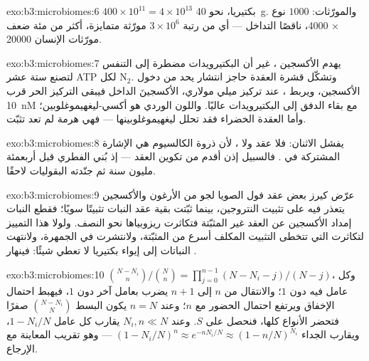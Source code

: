 \begin{solution}{exo:b3:microbiomes:6}
$400\times 10^{11} = 4\times 10^{13}$ بكتيريا، نحو \qty{40}{g}.
والمورّثات: $1000$ نوع $\times$ \num{4000}، ناقصًا التداخل ---
أي من رتبة $3\times 10^{6}$ مورّثة متمايزة، أكثر من مئة ضعف
مورّثات الإنسان \num{20000}.
\end{solution}

\begin{solution}{exo:b3:microbiomes:7}
يهدم الأكسجين ، غير أن البكتيرويدات مضطرة إلى
التنفس لتصنع ستة عشر ATP لكل N$_{2}$. وتشكّل قشرة العقدة
حاجز انتشار يحد من دخول الأكسجين، ويربط ،
عند تركيز ميلي مولاري، الأكسجينَ الداخل فيبقى التركيز الحر
قرب \qty{10}{nM} مع بقاء الدفق إلى البكتيرويدات عاليًا.
واللون الوردي هو أكسي-ليغهيموغلوبين؛ وأما العقدة الخضراء
فقد تحلل ليغهيموغلوبينها --- فهي هرمة لم تعد تثبّت.
\end{solution}

\begin{solution}{exo:b3:microbiomes:8}
يفشل الاثنان: فلا عقد ولا ، لأن ذروة
الكالسيوم هي الإشارة المشتركة في .
فالسبيل إذن أقدم من تكوين العقد --- إذ بُني  الفطري
قبل أربعمئة مليون سنة ثم جنّدته البقوليات 
لاحقًا.
\end{solution}

\begin{solution}{exo:b3:microbiomes:9}
عرّض كيرز بعض عقد فول الصويا لجو من الأرغون والأكسجين
يتعذر فيه على  تثبيت النتروجين، بينما ثبّتت بقية
عقد النبات تثبيتًا سويًا؛ فقطع النبات إمداد الأكسجين عن
العقد غير المثبّتة فتكاثرت ريزوبياها نحو النصف. ولولا هذا
التمييز لتكاثرت  التي تتخطى التثبيت المكلف أسرع
من المثبّتة، ولانتشرت في الجمهرة، ولانتهت النباتات إلى
إيواء بكتيريا لا تعطي شيئًا: فينهار .
\end{solution}

\begin{solution}{exo:b3:microbiomes:10}
$\binom{N-N_{i}}{n}/\binom{N}{n} = \prod_{j=0}^{n-1}(N - N_{i} - j)/(N -
j)$، وكل عامل فيه دون $1$؛ والانتقال من $n$ إلى $n + 1$ يضرب
بعامل آخر دون $1$، فيهبط احتمال الإخفاق ويرتفع احتمال
الحضور مع $n$؛ وعند $n = N$ يكون البسط $\binom{N -
N_{i}}{N}$ صفرًا فتحضر الأنواع كلها، فنحصل على $S$. وعند $N_{i},
n \ll N$ يقارب كل عامل $1 - N_{i}/N$، ويقارب الجداء $(1 -
N_{i}/N)^{n} \approx e^{-nN_{i}/N} \approx (1 - n/N)^{N_{i}}$ ---
وهو تقريب المعاينة مع الإرجاع.
\end{solution}

